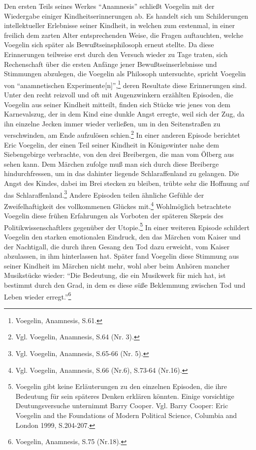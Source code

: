 Den ersten Teils seines Werkes "`Anamnesis"' schließt Voegelin mit der
Wiedergabe einiger Kindheitserinnerungen ab. Es handelt sich um
Schilderungen intellektueller Erlebnisse seiner Kindheit, in welchen zum
erstenmal, in einer freilich dem zarten Alter entsprechenden Weise, die
Fragen auftauchten, welche Voegelin sich später als Bewußtseinsphilosoph
erneut stellte. Da diese Erinnerungen teilweise erst durch den Versuch
wieder zu Tage traten, sich Rechenschaft über die ersten Anfänge jener
Bewußtseinserlebnisse und Stimmungen abzulegen, die Voegelin als
Philosoph untersuchte, spricht Voegelin von "`anamnetischen
Experimente[n]"',\footnote{Voegelin, Anamnesis, S.61.}  deren Resultate
diese Erinnerungen sind. Unter den recht reizvoll und oft mit
Augenzwinkern erzählten Episoden, die Voegelin aus seiner Kindheit
mitteilt, finden sich Stücke wie jenes von dem Karnevalszug, der in dem
Kind eine dunkle Angst erregte, weil sich der Zug, da ihn einzelne
Jecken immer wieder verließen, um in den Seitenstraßen zu verschwinden,
am Ende aufzulösen schien.\footnote{Vgl. Voegelin, Anamnesis, S.64 (Nr.
  3).}  In einer anderen Episode berichtet Eric Voegelin, der einen Teil
seiner Kindheit in Königswinter nahe dem Siebengebirge verbrachte, von
den drei Breibergen, die man vom Ölberg aus sehen kann. Dem Märchen
zufolge muß man sich durch diese Breiberge hindurchfressen, um in das
dahinter liegende Schlaraffenland zu gelangen. Die Angst des Kindes,
dabei im Brei stecken zu bleiben, trübte sehr die Hoffnung auf das
Schlaraffenland.\footnote{Vgl. Voegelin, Anamnesis, S.65-66 (Nr. 5).}
Andere Episoden teilen ähnliche Gefühle der Zweifelhaftigkeit des
vollkommenen Glückes mit.\footnote{Vgl. Voegelin, Anamnesis, S.66
  (Nr.6), S.73-64 (Nr.16).} Wohlmöglich betrachtete Voegelin diese
frühen Erfahrungen als Vorboten der späteren Skepsis des
Politikwissenschaftlers gegenüber der Utopie.\footnote{Voegelin gibt
  keine Erläuterungen zu den einzelnen Episoden, die ihre Bedeutung für
  sein späteres Denken erklären könnten. Einige vorsichtige
  Deutungsversuche unternimmt Barry Cooper. Vgl. Barry Cooper: Eric
  Voegelin and the Foundations of Modern Political Science, Columbia and
  London 1999, S.204-207.} In einer weiteren Episode schildert Voegelin
den starken emotionalen Eindruck, den das Märchen vom Kaiser und der
Nachtigall, die durch ihren Gesang den Tod dazu erweicht, vom Kaiser
abzulassen, in ihm hinterlassen hat. Später fand Voegelin diese
Stimmung aus seiner Kindheit im Märchen nicht mehr, wohl aber beim
Anhören mancher Musikstücke wieder: "`Die Bedeutung, die ein Musikwerk
für mich hat, ist bestimmt durch den Grad, in dem es diese süße
Beklemmung zwischen Tod und Leben wieder erregt."'\footnote{Voegelin,
  Anamnesis, S.75 (Nr.18).}
 
